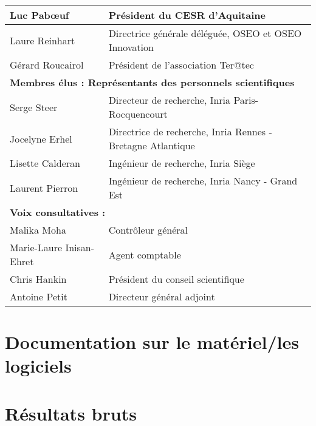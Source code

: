 \documentclass[a4paper, 11pt]{report}
\begin{document}
\begin{tabular}{|l|p{8cm}|}
        \hline
        Luc Pabœuf & Président du CESR d’Aquitaine \\
        \hline
        Laure Reinhart & Directrice générale déléguée, OSEO et OSEO Innovation \\
        \hline
        Gérard Roucairol & Président de l’association Ter@tec \\
        \hline
        \multicolumn{2}{l}{\textbf{Membres élus : Représentants des personnels scientifiques}} \\
        \hline
        Serge Steer & Directeur de recherche, Inria Paris-Rocquencourt \\
        \hline
        Jocelyne Erhel & Directrice de recherche, Inria Rennes - Bretagne Atlantique \\
        \hline
        Lisette Calderan & Ingénieur de recherche, Inria Siège \\
        \hline
        Laurent Pierron & Ingénieur de recherche, Inria Nancy - Grand Est \\
        \hline
        \multicolumn{2}{l}{\textbf{Voix consultatives :}} \\
        \hline
        Malika Moha & Contrôleur général \\
        \hline
        Marie-Laure Inisan-Ehret & Agent comptable \\
        \hline
        Chris Hankin & Président du conseil scientifique \\
        \hline
        Antoine Petit & Directeur général adjoint \\
        \hline
    \end{tabular}
  \section{Documentation sur le matériel/les logiciels}
  \section{Résultats bruts}
\end{document}
